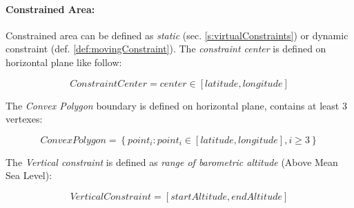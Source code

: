 \paragraph{Constrained Area:} Constrained area can be defined as \emph{static} (sec. \ref{s:virtualConstraints}) or dynamic constraint (def. \ref{def:movingConstraint}).  The \emph{constraint center} is defined on horizontal plane like follow:

\begin{equation}
    Constraint Center = center \in \left [latitude, longitude\right]
\end{equation}

\noindent The \emph{Convex Polygon} boundary is defined on horizontal plane, contains at least 3 vertexes:

\begin{equation}
    Convex Polygon = \left\{point_i:point_i\in \left [latitude, longitude\right], i \ge 3\right\}
\end{equation}

\noindent The \emph{Vertical constraint} is defined as \emph{range of barometric altitude} (Above Mean Sea Level):

\begin{equation}
    Vertical Constraint = \left [ start Altitude, end Altitude \right ]
\end{equation}

